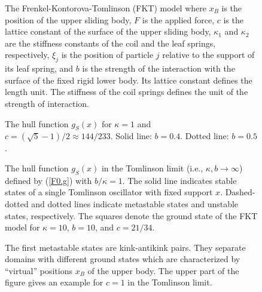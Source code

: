 \begin{figure}
\caption{\protect\label{f1}
The Frenkel-Kontorova-Tomlinson (FKT) model where $x_B$ is the
position of the upper sliding body, $F$ is the applied force, $c$ is
the lattice constant of the surface of the upper sliding body,
$\kappa_1$ and $\kappa_2$ are the stiffness constants of the coil and
the leaf springs, respectively, $\xi_j$ is the position of particle
$j$ relative to the support of its leaf spring, and $b$ is the
strength of the interaction with the surface of the fixed rigid lower
body. Its lattice constant defines the length unit.  The stiffness of
the coil springs defines the unit of the strength of interaction.}
\end{figure}

\begin{figure}[htbp]
\caption[hull]{\protect\label{f.hull}
The hull function $g_S(x)$ for $\kappa=1$ and
$c=(\sqrt{5}-1)/2\approx 144/233$. Solid line: $b=0.4$. Dotted line:
$b=0.5$.}
\end{figure}

\begin{figure}[htbp]
\caption[hull2]{\protect\label{f.hull2}
The hull function $g_S(x)$ in the Tomlinson limit (i.e.,
$\kappa,b\to\infty$) defined by (\ref{F0.g}) with $b/\kappa=1$. The
solid line indicates stable states of a single Tomlinson oscillator
with fixed support $x$. Dashed-dotted and dotted lines indicate
metastable states and unstable states, respectively. The squares 
denote the ground state of the FKT model for $\kappa=10$, $b=10$, and
$c=21/34$.}
\end{figure}

\begin{figure}[htbp]
\caption[kink]{\protect\label{f.kink}
The first metastable states are kink-antikink pairs. They separate
domains with different ground states which are characterized by
``virtual'' positions $x_B$ of the upper body. The upper part of the
figure gives an example for $c=1$ in the Tomlinson limit.}
\end{figure}

